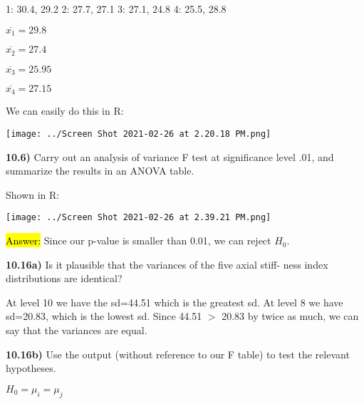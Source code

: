 \documentclass{article}
\begin{document}
\vspace{2mm}

1: 30.4, 29.2 
2: 27.7, 27.1
3: 27.1, 24.8 
4: 25.5, 28.8

$\overline{x_{1}}=29.8$

$\overline{x_{2}}=27.4$

$\overline{x_{3}}=25.95$

$\overline{x_{4}}=27.15$


\vspace{2mm}

We can easily do this in R:

\vspace{2mm}

\texttt{[image: ../Screen Shot 2021-02-26 at 2.20.18 PM.png]} 






\newpage
\textbf{10.6)} Carry out an analysis of variance F test at significance level .01, and summarize the results in an ANOVA table.

\vspace{2mm}

Shown in R:

\vspace{2mm}

\texttt{[image: ../Screen Shot 2021-02-26 at 2.39.21 PM.png]} 

\hl{Answer:} Since our p-value is smaller than 0.01, we can reject $H_{0}$.




\newpage
\textbf{10.16a)} Is it plausible that the variances of the five axial stiff- ness index distributions are identical?

\vspace{2mm}

At level 10 we have the sd=44.51 which is the greatest sd. At level 8 we have sd=20.83, which is the lowest sd. Since 44.51 $>$ 20.83 by twice as much, we can say that the variances are equal.

\vspace{5mm}


\textbf{10.16b)} Use the output (without reference to our F table) to test the relevant hypotheses.

\vspace{2mm}

$H_{0}=\mu_{i}=\mu_{j}$

\vspace{2mm}
\end{document}
